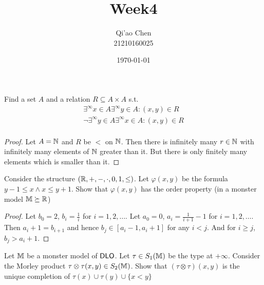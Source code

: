 \documentclass[11pt]{article}
\author{Qi'ao Chen\\21210160025}
\date{\today}
\title{Week4}
\begin{document}
\maketitle
\begin{exercise}
Find a set \(A\) and a relation \(R\subseteq A\times A\) s.t.
\begin{gather*}
\exists^\infty x\in A\exists^\infty y\in A:(x,y)\in R\\
\neg\exists^\infty y\in A\exists^\infty x\in A:(x,y)\in R\\
\end{gather*}
\end{exercise}

\begin{proof}
Let \(A=\mathbb{N}\) and \(R\) be \(<\) on \(\mathbb{N}\). Then there is infinitely many \(r\in\mathbb{N}\) with infinitely many
elements of \(\mathbb{N}\) greater than it. But there is only finitely many elements which is smaller than it.
\end{proof}

\begin{exercise}
Consider the structure \((\mathbb{R},+,-,\cdot,0,1,\le)\). Let \(\varphi(x,y)\) be the formula \(y-1\le x\wedge x\le y+1\). Show
that \(\varphi(x,y)\) has the order property (in a monster model \(\mathbb{M}\succeq\mathbb{R}\))
\end{exercise}

\begin{proof}
Let \(b_0=2\), \(b_i=\frac{1}{i}\) for \(i=1,2,\dots\). Let \(a_0=0\), \(a_i=\frac{1}{i+1}-1\)
for \(i=1,2,\dots\). Then \(a_i+1=b_{i+1}\) and hence \(b_j\in[a_i-1,a_i+1]\) for any \(i<j\). And
for \(i\ge j\), \(b_j>a_i+1\).
\end{proof}

\begin{exercise}
Let \(\mathbb{M}\) be a monster model of \(\operatorname{\textsf{DLO}}\). Let \(\tau\in S_1(\mathbb{M})\) be the type at \(+\infty\). Consider the
Morley product \(\tau\otimes\tau(x,y)\in S_2(\mathbb{M})\). Show that \((\tau\otimes\tau)(x,y)\) is the unique completion of \(\tau(x)\cup\tau(y)\cup\{x<y\}\)
\end{exercise}
\end{document}
